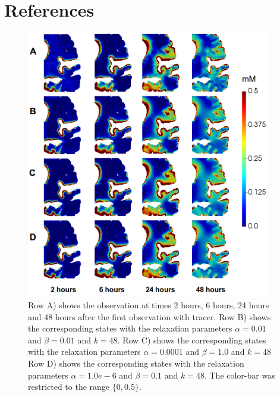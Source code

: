 \documentclass[11pt,a4paper]{article}
\begin{document}
\section{References}





 



 
\begin{figure}
\centering
\includegraphics[width=0.95\textwidth]{different.png} 
\caption{Row A) shows the observation at times 2 hours, 6 hours, 24 hours and 48 hours after the first observation with tracer. Row B) shows the corresponding states with the relaxation parameters $\alpha=0.01$ and $\beta=0.01$ and $k=48$.   Row C) shows the corresponding states with the relaxation parameters $\alpha=0.0001$ and $\beta=1.0$ and $k=48$
 Row D) shows the corresponding states with the relaxation parameters $\alpha=1.0e-6$ and $\beta=0.1$ and $k=48$. The color-bar was restricted to the range $ \lbrace 0 ,0.5 \rbrace$. }
\label{Fig::realdata}
\end{figure}
\end{document}
